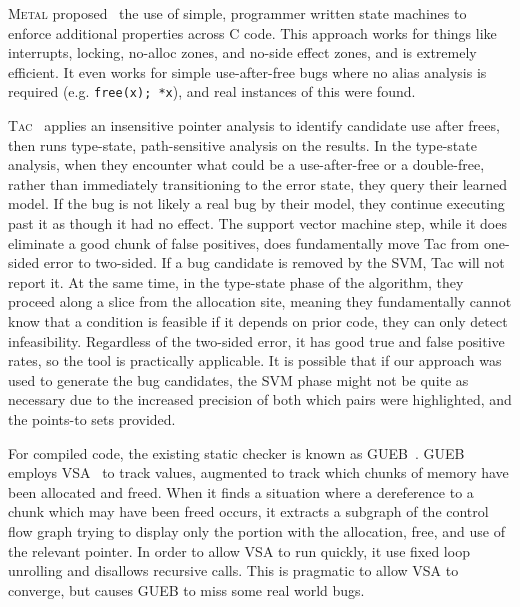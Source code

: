 \textsc{Metal} proposed~\cite{metal} the use of simple, programmer written state machines to enforce additional properties across C code.
This approach works for things like interrupts, locking, no-alloc zones, and no-side effect zones, and is extremely efficient.
It even works for simple use-after-free bugs where no alias analysis is required (e.g. \texttt{free(x); *x}), and real instances of this were found.

\textsc{Tac}~\cite{tac} applies an insensitive pointer analysis to identify candidate use after frees, then runs type-state, path-sensitive analysis on the results.
In the type-state analysis, when they encounter what could be a use-after-free or a double-free, rather than immediately transitioning to the error state, they query their learned model.
If the bug is not likely a real bug by their model, they continue executing past it as though it had no effect.
The support vector machine step, while it does eliminate a good chunk of false positives, does fundamentally move Tac from one-sided error to two-sided.
If a bug candidate is removed by the SVM, Tac will not report it.
At the same time, in the type-state phase of the algorithm, they proceed along a slice from the allocation site, meaning they fundamentally cannot know that a condition is feasible if it depends on prior code, they can only detect infeasibility.
Regardless of the two-sided error, it has good true and false positive rates, so the tool is practically applicable.
It is possible that if our approach was used to generate the bug candidates, the SVM phase might not be quite as necessary due to the increased precision of both which pairs were highlighted, and the points-to sets provided.

For compiled code, the existing static checker is known as GUEB~\cite{gueb}.
GUEB employs VSA~\cite{vsa} to track values, augmented to track which chunks of memory have been allocated and freed.
When it finds a situation where a dereference to a chunk which may have been freed occurs, it extracts a subgraph of the control flow graph trying to display only the portion with the allocation, free, and use of the relevant pointer.
In order to allow VSA to run quickly, it use fixed loop unrolling and disallows recursive calls.
This is pragmatic to allow VSA to converge, but causes GUEB to miss some real world bugs.


